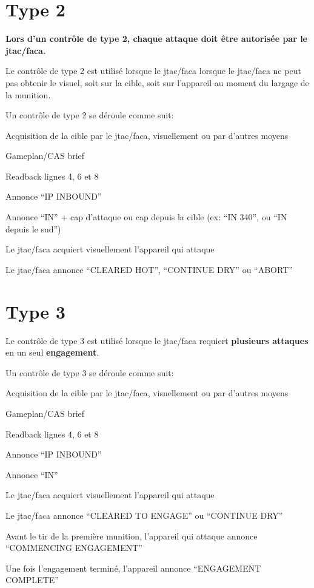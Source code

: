 \section{Type 2}
\e
    \item \textbf{Lors d'un contrôle de type 2, chaque attaque doit être autorisée par le \gls{jtac}/\gls{faca}.}
    \item Le contrôle de type 2 est utilisé lorsque le \gls{jtac}/\gls{faca} lorsque le \gls{jtac}/\gls{faca} ne peut pas obtenir le visuel, soit sur la cible, soit sur l'appareil au moment du largage de la munition.
    \item Un contrôle de type 2 se déroule comme suit:
    \ee
        \item Acquisition de la cible par le \gls{jtac}/\gls{faca}, visuellement ou par d'autres moyens
        \item Gameplan/CAS brief
        \item Readback lignes 4, 6 et 8
        \item Annonce ``IP INBOUND''
        \item Annonce ``IN'' + cap d'attaque ou cap depuis la cible (ex: ``IN 340'', ou ``IN depuis le sud'')
        \item Le \gls{jtac}/\gls{faca} acquiert visuellement l'appareil qui attaque
        \item Le \gls{jtac}/\gls{faca} annonce ``CLEARED HOT'', ``CONTINUE DRY'' ou ``ABORT''
    \ed
\ed

\section{Type 3}
\e
    \item Le contrôle de type 3 est utilisé lorsque le \gls{jtac}/\gls{faca} requiert \textbf{plusieurs attaques} en un seul \textbf{engagement}.
    \item Un contrôle de type 3 se déroule comme suit:
    \ee
        \item Acquisition de la cible par le \gls{jtac}/\gls{faca}, visuellement ou par d'autres moyens
        \item Gameplan/CAS brief
        \item Readback lignes 4, 6 et 8
        \item Annonce ``IP INBOUND''
        \item Annonce ``IN''
        \item Le \gls{jtac}/\gls{faca} acquiert visuellement l'appareil qui attaque
        \item Le \gls{jtac}/\gls{faca} annonce ``CLEARED TO ENGAGE'' ou ``CONTINUE DRY''
        \item Avant le tir de la première munition, l'appareil qui attaque annonce ``COMMENCING ENGAGEMENT''
        \item Une fois l'engagement terminé, l'appareil annonce ``ENGAGEMENT COMPLETE''
    \ed
\ed

